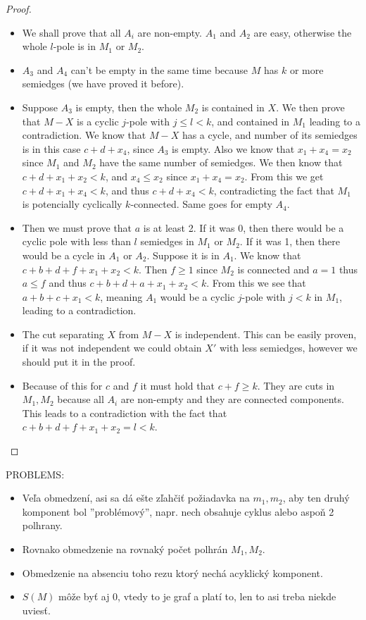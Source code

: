 \documentclass[12pt, twoside]{book}
\begin{document}
\begin{proof}
\begin{itemize}
		\item We shall prove that all $A_i$ are non-empty. $A_1$ and $A_2$ are easy, otherwise the whole $l$-pole is in $M_1$ or $M_2$.
		\item $A_3$ and $A_4$ can't be empty in the same time because $M$ has $k$ or more semiedges (we have proved it before).
		\item Suppose $A_3$ is empty, then the whole $M_2$ is contained in $X$. We then prove that $M-X$ is a cyclic $j$-pole with $j\leq l < k$, and contained in $M_1$ leading to a contradiction. We know that $M-X$ has a cycle, and number of its semiedges is in this case $c+d+x_4$, since $A_3$ is empty. Also we know that $x_1+x_4=x_2$ since $M_1$ and $M_2$ have the same number of semiedges. We then know that $c+d+x_1+x_2<k$, and $x_4\leq x_2$ since $x_1+x_4=x_2$. From this we get $c+d+x_1+x_4<k$, and thus $c+d+x_4<k$, contradicting the fact that $M_1$ is potencially cyclically $k$-connected. Same goes for empty $A_4$.
		\item Then we must prove that $a$ is at least 2. If it was 0, then there would be a cyclic pole with less than $l$ semiedges in $M_1$ or $M_2$. If it was 1, then there would be a cycle in $A_1$ or $A_2$. Suppose it is in $A_1$. We know that $c+b+d+f+x_1+x_2<k$. Then $f\geq 1$ since $M_2$ is connected and $a=1$ thus $a\leq f$ and thus $c+b+d+a+x_1+x_2<k$. From this we see that $a+b+c+x_1<k$, meaning $A_1$ would be a cyclic $j$-pole with $j<k$ in $M_1$, leading to a contradiction.
		\item The cut separating $X$ from $M-X$ is independent. This can be easily proven, if it was not independent we could obtain $X'$ with less semiedges, however we should put it in the proof.
		\item Because of this for $c$ and $f$ it must hold that $c+f\geq k$. They are cuts in $M_1, M_2$ because all $A_i$ are non-empty and they are connected components. This leads to a contradiction with the fact that $c+b+d+f+x_1+x_2=l<k$.
	\end{itemize}
\end{proof}

PROBLEMS:

\begin{itemize}
	\item Veľa obmedzení, asi sa dá ešte zľahčiť požiadavka na $m_1,m_2$, aby ten druhý komponent bol ''problémový'', napr. nech obsahuje cyklus alebo aspoň 2 polhrany.
	\item Rovnako obmedzenie na rovnaký počet polhrán $M_1,M_2$.
	\item Obmedzenie na absenciu toho rezu ktorý nechá acyklický komponent.
	\item $S(M)$ môže byť aj 0, vtedy to je graf a platí to, len to asi treba niekde uviesť.
\end{itemize}
\end{document}
